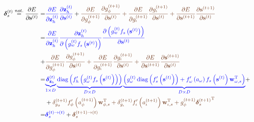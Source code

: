 \documentclass[11pt]{article}
\DeclareMathOperator{\diag}{diag}
\begin{document}
\begin{equation}
  \begin{split}
    \boldsymbol{\delta}_{s}^{(t)} \overset{not.}{=} \dfrac{\partial
      E}{\partial \mathbf{s}^{(t)}} = & {\color{blue}
      \dfrac{\partial E}{\partial \mathbf{z}_h^{(t)}}
      \dfrac{\partial \mathbf{z}_h^{(t)}}{\partial
        \mathbf{s}^{(t)}}} + {\color{auburn}\dfrac{\partial
        E}{\partial g_{\phi}^{(t+1)}} \dfrac{\partial
        g_{\phi}^{(t+1)}}{\partial \mathbf{s}^{(t)}} +
      \dfrac{\partial E}{\partial g_{\iota}^{(t+1)}} \dfrac{\partial
        g_{\iota}^{(t+1)}}{\partial \mathbf{s}^{(t)}} +
      \dfrac{\partial E}{\partial \mathbf{s}^{(t+1)}}
      \dfrac{\partial \mathbf{s}^{(t+1)}}{\partial
        \mathbf{s}^{(t)}}}
    \\
    = & {\color{blue}
      \dfrac{\partial E}{\partial \mathbf{z}_h^{(t)}}
      \dfrac{\partial \mathbf{z}_h^{(t)}}{\partial
        \left(g_w^{(t)} f_s \left(\mathbf{s}^{(t)} \right) \right)}
      \dfrac{\partial
        \left(g_w^{(t)} f_s\left(\mathbf{s}^{(t)} \right)\right)}
      {\partial \mathbf{s}^{(t)}}
    } \\ + & {\color{auburn}\dfrac{\partial
      E}{\partial g_{\phi}^{(t+1)}} \dfrac{\partial
      g_{\phi}^{(t+1)}}{\partial \mathbf{s}^{(t)}} +
    \dfrac{\partial E}{\partial g_{\iota}^{(t+1)}} \dfrac{\partial
      g_{\iota}^{(t+1)}}{\partial \mathbf{s}^{(t)}} +
    \dfrac{\partial E}{\partial \mathbf{s}^{(t+1)}}
    \dfrac{\partial \mathbf{s}^{(t+1)}}{\partial
      \mathbf{s}^{(t)}}}
  \\
  = & {\color{blue}
    \underbrace{\boldsymbol{\delta}_{\mathbf{z}_h}^{(t)}}_{1\times D}
    \underbrace{\diag\left(f_{h}'\left(g_{\omega}^{(t)} f_s\left(\mathbf{s}^{(t)}\right)\right)\right)}_{D\times D}
    \underbrace{\left( g_{\omega}^{(t)} \diag\left(f_s'\left(\mathbf{s}^{(t)}\right) \right) + f'_{\omega}\left(a_{\omega} \right) f_s\left(\mathbf{s}^{(t)}\right)\mathbf{w}^{\text{T}}_{\omega, s} \right) }_{D \times D}} + \\
     & +
     {\color{auburn}\delta_{g_{\phi}}^{(t+1)}f_{\phi}'\left(a_{\phi}^{(t+1)}\right)\mathbf{w}_{\phi,
         s}^{\text{T}} +
       \delta_{g_{\iota}}^{(t+1)}f_{\iota}'\left(a_{\iota}^{(t+1)}\right)\mathbf{w}_{\iota,
         s}^{\text{T}} +
       g_{\phi}^{(t+1)}{\boldsymbol{\delta}_{s}^{(t+1)}}^{\text{T}}} \\
     = & {\color{blue}\boldsymbol{\delta}^{(t) \rightarrow (t)}_s} +
     {\color{auburn}\boldsymbol{\delta}^{(t+1) \rightarrow (t)}_s}
  \end{split}
\end{equation}
\end{document}
